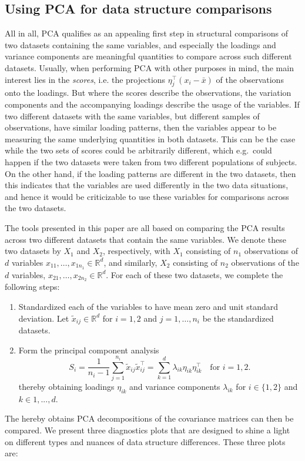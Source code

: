 \documentclass[titlepage,11pt,twoside]{article}
\newcommand{\RR}{\mathbb{R}}
\begin{document}
\subsection{Using PCA for data structure comparisons}
All in all, PCA qualifies as an appealing first step in structural comparisons of two datasets containing the same variables, and especially the loadings and variance components are meaningful quantities to compare across such different datasets. Usually, when performing PCA with other purposes in mind, the main interest lies in the \textit{scores}, i.e. the projections $\eta_j^\top (x_i - \bar{x})$ of the observations onto the loadings. But where the scores describe the observations, the variation components and the accompanying loadings describe the usage of the variables. If two different datasets with the same variables, but different samples of observations, have similar loading patterns, then the variables appear to be measuring the same underlying quantities in both datasets. This can be the case while the two sets of scores could be arbitrarily different, which e.g.\ could happen if the two datasets were taken from two different populations of subjects. On the other hand, if the loading patterns are different in the two datasets, then this indicates that the variables are used differently in the two data situations, and hence it would be criticizable to use these variables for comparisons across the two datasets.

The tools presented in this paper are all based on comparing the PCA results across two different datasets that contain the same variables. We denote these two datasets by $X_1$ and $X_2$, respectively, with $X_1$ consisting of $n_1$ observations of $d$ variables $x_{11},\dotsc,x_{1 n_1} \in \RR^d$, and similarly, $X_2$ consisting of $n_2$ observations of the $d$ variables, $x_{21},\dotsc,x_{2 n_2} \in \RR^d$. For each of these two datasets, we complete the following steps:
\begin{enumerate}
\item Standardized each of the variables to have mean zero and unit standard deviation. Let $\tilde{x}_{ij} \in \RR^d$ for $i=1,2$ and $j=1,\dotsc,n_i$ be the standardized datasets. 
\item Form the principal component analysis
\begin{equation*}
S_i = \frac{1}{n_i-1} \sum_{j=1}^{n_i} \tilde{x}_{ij} \tilde{x}_{ij}^\top = \sum_{k=1}^d \lambda_{ik} \eta_{ik} \eta_{ik}^\top \quad \text{for $i=1,2$.}
\end{equation*}
thereby obtaining loadings $\eta_{ik}$ and variance components $\lambda_{ik}$ for $i \in \{1, 2\}$ and $k \in 1, ..., d$.
\end{enumerate}
The hereby obtains PCA decompositions of the covariance matrices can then be compared. We present three diagnostics plots that are designed to shine a light on different types and nuances of data structure differences. These three plots are:
\end{document}
